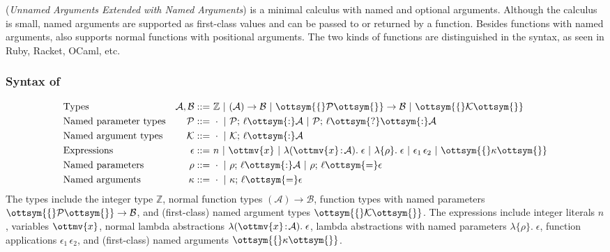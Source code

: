 \uaena (\emph{Unnamed Arguments Extended with Named Arguments})
is a minimal calculus with named and optional arguments. Although the
calculus is small, named arguments are supported as first-class values and can
be passed to or returned by a function. Besides functions with named
arguments, \uaena also supports normal functions with positional
arguments. The two kinds of functions are distinguished in the syntax, as seen in
Ruby, Racket, OCaml, etc.

\subsubsection{Syntax of \uaena}
\begin{align*}
  &\text{Types}                 &\mathcal{A},\mathcal{B} ::=&~  \mathbb{Z}  ~|~  ( \mathcal{A} ) \rightarrow \mathcal{B}  ~|~ \ottsym{\{}  \mathcal{P}  \ottsym{\}}  \rightarrow  \mathcal{B} ~|~ \ottsym{\{}  \mathcal{K}  \ottsym{\}} \\
  &\text{Named parameter types} &        \mathcal{P} ::=&~  \cdot  ~|~ \mathcal{P}  ;\,  \ell  \ottsym{:}  \mathcal{A} ~|~ \mathcal{P}  ;\,  \ell  \ottsym{\mbox{?}}  \ottsym{:}  \mathcal{A} \\
  &\text{Named argument types}  &        \mathcal{K} ::=&~  \cdot  ~|~ \mathcal{K}  ;\,  \ell  \ottsym{:}  \mathcal{A} \\
  &\text{Expressions}           &       \epsilon ::=&~  n  ~|~ \ottmv{x} ~|~  \lambda ( \ottmv{x} \!:\! \mathcal{A} ).\; \epsilon  ~|~  \lambda \{ \rho \}.\; \epsilon  ~|~ \epsilon_{{\mathrm{1}}} \, \epsilon_{{\mathrm{2}}} ~|~ \ottsym{\{}  \kappa  \ottsym{\}} \\
  &\text{Named parameters}      &        \rho ::=&~  \cdot  ~|~ \rho  ;\,  \ell  \ottsym{:}  \mathcal{A} ~|~ \rho  ;\,  \ell  \ottsym{=}  \epsilon \\
  &\text{Named arguments}       &        \kappa ::=&~  \cdot  ~|~ \kappa  ;\,  \ell  \ottsym{=}  \epsilon
\end{align*}
The types include the integer type $ \mathbb{Z} $, normal function types $ ( \mathcal{A} ) \rightarrow \mathcal{B} $,
function types with named parameters $\ottsym{\{}  \mathcal{P}  \ottsym{\}}  \rightarrow  \mathcal{B}$, and (first-class)
named argument types $\ottsym{\{}  \mathcal{K}  \ottsym{\}}$. The expressions include integer literals
$ n $, variables $\ottmv{x}$, normal lambda abstractions $ \lambda ( \ottmv{x} \!:\! \mathcal{A} ).\; \epsilon $,
lambda abstractions with named parameters $ \lambda \{ \rho \}.\; \epsilon $, function applications
$\epsilon_{{\mathrm{1}}} \, \epsilon_{{\mathrm{2}}}$, and (first-class) named arguments $\ottsym{\{}  \kappa  \ottsym{\}}$.

